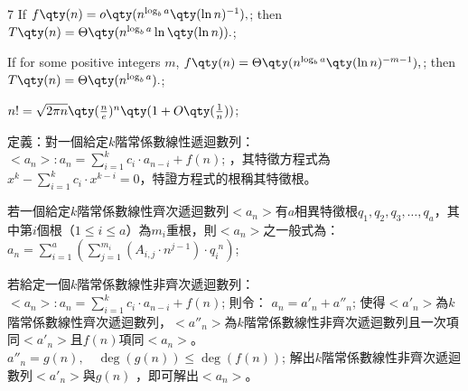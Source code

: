 \documentclass[a4paper,10pt]{extarticle}
\begin{document}
\begin{multicols}{7}
If
\(f\qty(n)=o\qty(n^{\log_ba}\qty(\ln n)^{-1}),\); 
then
\(T\qty(n)=\Theta\qty(n^{\log_ba}\ln\qty(\ln n)).\); 

If for some positive integers $m$,
\(f\qty(n)=\Theta\qty(n^{\log_ba}\qty(\ln n)^{-m-1}),\); 
then
\(T\qty(n)=\Theta\qty(n^{\log_ba}).\); 


\(n!=\sqrt{2\pi n}\qty(\frac{n}{e})^n\qty(1+O\qty(\frac{1}{n}))\);


定義：對一個給定$k$階常係數線性遞迴數列：
\(<a_n>: a_n=\sum_{i=1}^k c_i \cdot a_{n-i} + f(n)\); 
，其特徵方程式為$x^k-\sum_{i=1}^k c_i \cdot x^{k-i}=0$，特證方程式的根稱其特徵根。

若一個給定$k$階常係數線性齊次遞迴數列$<a_n>$有$a$相異特徵根$q_1, q_2, q_3, \ldots, q_a$，其中第$i$個根（$1\leq i\leq a$）為$m_i$重根，則$<a_n>$之一般式為：
\(a_n=\sum_{i=1}^{a} \left( \sum_{j=1}^{m_i} \left(A_{i,j}\cdot n^{j-1}\right) \cdot q_i^{\phantom{i}n} \right)\); 

若給定一個$k$階常係數線性非齊次遞迴數列：
\(<a_n>: a_n=\sum_{i=1}^k c_i \cdot a_{n-i} + f(n)\); 
則令：
\(a_n = a'_n+a''_n \); 
使得$<a'_n>$為$k$階常係數線性齊次遞迴數列，$<a''_n>$為$k$階常係數線性非齊次遞迴數列且一次項同$<a'_n>$且$f(n)$項同$<a_n>$。
\(a''_n = g(n),\quad\deg(g(n))\leq \deg(f(n))\); 
解出$k$階常係數線性非齊次遞迴數列$<a'_n>$與$g(n)$ ，即可解出$<a_n>$。



\end{multicols}
\end{document}
